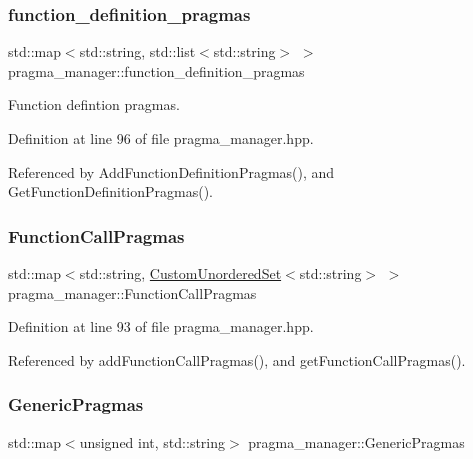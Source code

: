 \subsubsection{\texorpdfstring{function\+\_\+definition\+\_\+pragmas}{function\_definition\_pragmas}}
{\footnotesize\ttfamily std\+::map$<$std\+::string, std\+::list$<$std\+::string$>$ $>$ pragma\+\_\+manager\+::function\+\_\+definition\+\_\+pragmas\hspace{0.3cm}{\ttfamily [protected]}}



Function defintion pragmas. 



Definition at line 96 of file pragma\+\_\+manager.\+hpp.



Referenced by Add\+Function\+Definition\+Pragmas(), and Get\+Function\+Definition\+Pragmas().

\mbox{\label{classpragma__manager_ab00b1457c9061fdc6de3e91edc4a5269}} 
\subsubsection{\texorpdfstring{Function\+Call\+Pragmas}{FunctionCallPragmas}}
{\footnotesize\ttfamily std\+::map$<$std\+::string, \hyperlink{classCustomUnorderedSet}{Custom\+Unordered\+Set}$<$std\+::string$>$ $>$ pragma\+\_\+manager\+::\+Function\+Call\+Pragmas\hspace{0.3cm}{\ttfamily [protected]}}



Definition at line 93 of file pragma\+\_\+manager.\+hpp.



Referenced by add\+Function\+Call\+Pragmas(), and get\+Function\+Call\+Pragmas().

\mbox{\label{classpragma__manager_a1b280c103e7b315759406114d67760d1}} 
\subsubsection{\texorpdfstring{Generic\+Pragmas}{GenericPragmas}}
{\footnotesize\ttfamily std\+::map$<$unsigned int, std\+::string$>$ pragma\+\_\+manager\+::\+Generic\+Pragmas\hspace{0.3cm}{\ttfamily [protected]}}



